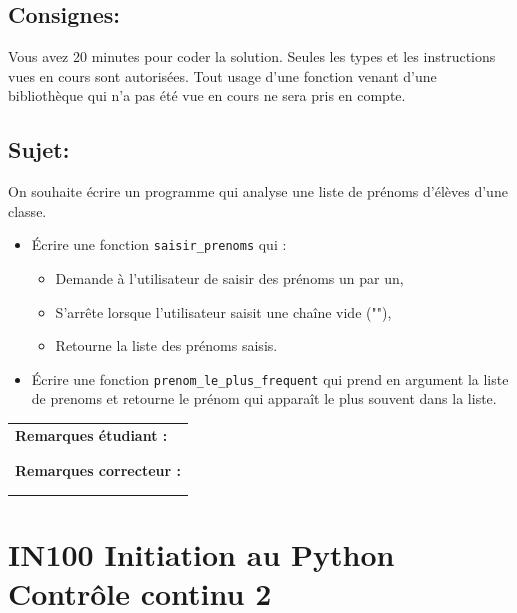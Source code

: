 \documentclass[a4paper,11pt]{article}
\begin{document}
\subsection*{Consignes:} Vous avez 20 minutes pour coder la solution. Seules les types et les instructions vues en cours sont autorisées. Tout usage d'une fonction 
venant d'une bibliothèque qui n'a pas été vue en cours ne sera pris en compte. 

\subsection*{Sujet:}

On souhaite écrire un programme qui analyse une liste de prénoms d’élèves d’une classe.

\begin{itemize}
\item[1.] Écrire une fonction \texttt{saisir\_prenoms} qui :

\begin{itemize}
\item Demande à l’utilisateur de saisir des prénoms un par un,
\item S’arrête lorsque l’utilisateur saisit une chaîne vide (""),
\item Retourne la liste des prénoms saisis.
\end{itemize}
\item[2.]  \'Ecrire une fonction \texttt{prenom\_le\_plus\_frequent} qui prend en argument la liste de prenoms
et retourne le prénom qui apparaît le plus souvent dans la liste.
\end{itemize}
\vspace{1 cm}

\begin{table}[h!]
\centering
\renewcommand{\arraystretch}{1.4} %
\begin{tabular}{|p{15cm}|}
\hline
\textbf{Remarques étudiant :}    \\
 \\
 \\
\hline
\textbf{Remarques correcteur :}  \\
 \\
 \\
\hline
\end{tabular}
\end{table}

\newpage

\section*{\center IN100 Initiation au Python\\
Contrôle continu 2}
\end{document}
